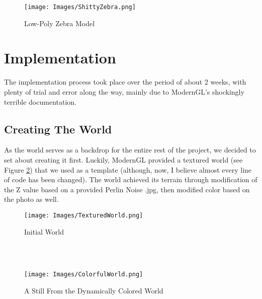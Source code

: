 \documentclass[conference]{IEEEtran}
\begin{document}
\begin{figure}[h]
    \centering
    \texttt{[image: Images/ShittyZebra.png]}
    \caption{Low-Poly Zebra Model}
    \label{fig:ShittyZebra}
\end{figure}

\section{Implementation}
The implementation process took place over the period of about 2 weeks, with plenty of trial and error along the way, mainly due to ModernGL's shockingly terrible documentation.
\subsection{Creating The World}
As the world serves as a backdrop for the entire rest of the project, we decided to set about creating it first. Luckily, ModernGL provided a textured world (see Figure \ref{fig:TexturedWorld}) that we used as a template (although, now, I believe almost every line of code has been changed). The world achieved its terrain through modification of the Z value based on a provided Perlin Noise .jpg, then modified color based on the photo as well.
\begin{figure}[h]
    \centering
    \texttt{[image: Images/TexturedWorld.png]}
    \caption{Initial World}
    \label{fig:TexturedWorld}
\end{figure}
\\
\\
\begin{figure}[h]
    \centering
    \texttt{[image: Images/ColorfulWorld.png]}
    \caption{A Still From the Dynamically Colored World}
    \label{fig:ColorfulWorld}
\end{figure}
\end{document}

